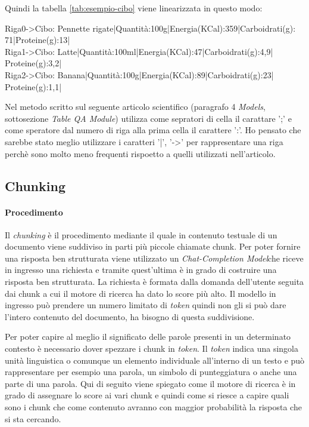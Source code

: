 Quindi la tabella \ref{tab:esempio-cibo} viene linearizzata in questo modo:
\begin{tcolorbox}[colback=white, colframe=black]
    Riga0->Cibo: Pennette rigate|Quantità:100g|Energia(KCal):359|Carboidrati(g): \\
    71|Proteine(g):13| \\
    Riga1->Cibo: Latte|Quantità:100ml|Energia(KCal):47|Carboidrati(g):4,9|\\
    Proteine(g):3,2| \\
    Riga2->Cibo: Banana|Quantità:100g|Energia(KCal):89|Carboidrati(g):23|\\
    Proteine(g):1,1|
\end{tcolorbox}

Nel metodo scritto sul seguente articolo scientifico \cite{art:multimodelqa} (paragrafo 4 \emph{Models}, sottosezione \emph{Table QA Module}) utilizza come sepratori di cella il carattare ';' e come speratore dal numero di riga alla prima cella il carattere ':'.
Ho pensato che sarebbe stato meglio utilizzare i caratteri '|', '->' per rappresentare una riga perchè sono molto meno frequenti rispoetto a quelli utilizzati nell'articolo.



\subsection{Chunking}
\paragraph{Procedimento}
Il \emph{chunking} è il procedimento mediante il quale in contenuto testuale di un documento viene suddiviso in parti più piccole chiamate chunk.
\noindent Per poter fornire una risposta ben strutturata viene utilizzato un \emph{\gls{Chat-Completion Model}}\glsfirstoccur che riceve in ingresso una richiesta e tramite quest'ultima è in grado di costruire una risposta ben strutturata.
La richiesta è formata dalla domanda dell'utente seguita dai chunk a cui il motore di ricerca ha dato lo score più alto.
Il modello in ingresso può prendere un numero limitato di \emph{token} quindi non gli si può dare l'intero contenuto del documento, ha bisogno di questa suddivisione.

\noindent Per poter capire al meglio il significato delle parole presenti in un determinato contesto è necessario dover spezzare i chunk in \emph{token}.
Il \emph{token} indica una singola unità linguistica o comunque un elemento individuale all'interno di un testo e può rappresentare per esempio una parola, un simbolo di punteggiatura o anche una parte di una parola.
Qui di seguito viene spiegato come il motore di ricerca è in grado di assegnare lo score ai vari chunk e quindi come si riesce a capire quali sono i chunk che come contenuto avranno con maggior probabilità la risposta che si sta cercando.

